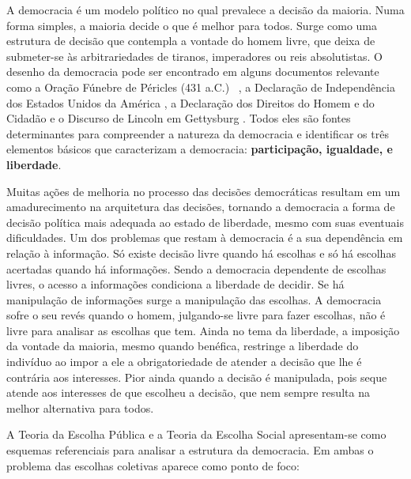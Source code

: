 


A democracia é um modelo político no qual prevalece a decisão da maioria. Numa forma simples, a maioria decide o que é melhor para todos. Surge como uma estrutura de decisão que contempla a vontade do homem livre, que deixa de submeter-se às arbitrariedades de tiranos, imperadores ou reis absolutistas. O desenho da democracia pode ser encontrado em alguns documentos relevante como a Oração Fúnebre de Péricles (431 a.C.)~ \cite{oracaoPericles}, a Declaração de Independência dos Estados Unidos da América \cite{euadeclara}, a Declaração dos Direitos do Homem e do Cidadão \cite{dcidadao} e o Discurso de Lincoln em Gettysburg \cite{dlincoln}. Todos eles são fontes determinantes para compreender a natureza da democracia e identificar  os três elementos básicos que caracterizam a democracia: \textbf{participação, igualdade, e liberdade}.

Muitas ações de melhoria no processo das decisões democráticas resultam em um amadurecimento na arquitetura das decisões, tornando a democracia a forma de decisão política mais adequada ao estado de liberdade, mesmo com suas eventuais dificuldades. Um dos problemas que restam à democracia é a sua dependência em relação à informação. Só existe decisão livre quando há escolhas e só há escolhas acertadas quando há informações. Sendo a democracia dependente de escolhas livres, o acesso a informações condiciona a liberdade de decidir. Se há manipulação de informações surge a manipulação das escolhas. A democracia sofre o seu revés quando o homem, julgando-se livre para fazer escolhas, não é livre para analisar as escolhas que tem. 
Ainda no tema da liberdade, a imposição da vontade da maioria, mesmo quando benéfica, restringe a liberdade do indivíduo ao impor a ele a obrigatoriedade de atender a decisão que lhe é contrária aos interesses. Pior ainda quando a decisão é manipulada, pois seque atende aos interesses de que escolheu a decisão, que nem sempre resulta na melhor alternativa para todos. 

A Teoria da Escolha Pública e a Teoria da Escolha Social apresentam-se como esquemas referenciais para analisar a estrutura da democracia. Em ambas o problema das escolhas coletivas aparece como ponto de foco:


